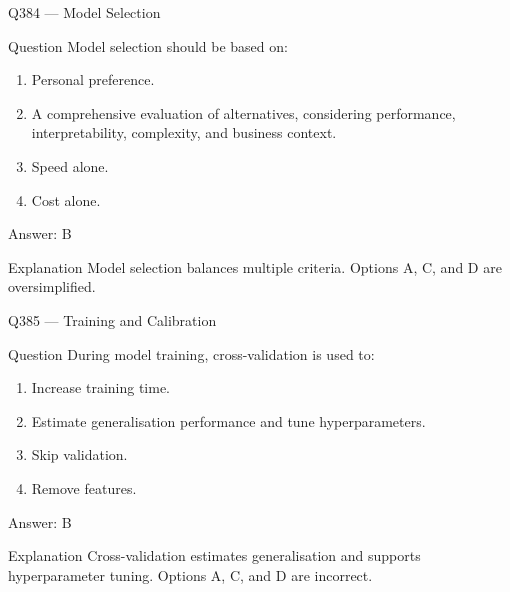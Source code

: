 \documentclass[aspectratio=169,8pt]{beamer}
\begin{document}
	\begin{frame}{Q384 --- Model Selection}
		\begin{block}{Question}
			Model selection should be based on:
			\begin{enumerate}
				\item Personal preference.
				\item A comprehensive evaluation of alternatives, considering performance, interpretability, complexity, and business context.
				\item Speed alone.
				\item Cost alone.
			\end{enumerate}
		\end{block}
		\begin{exampleblock}{Answer: B}\end{exampleblock}
		\begin{block}{Explanation}
			Model selection balances multiple criteria. Options A, C, and D are oversimplified.
		\end{block}
	\end{frame}
	
	\begin{frame}{Q385 --- Training and Calibration}
		\begin{block}{Question}
			During model training, cross-validation is used to:
			\begin{enumerate}
				\item Increase training time.
				\item Estimate generalisation performance and tune hyperparameters.
				\item Skip validation.
				\item Remove features.
			\end{enumerate}
		\end{block}
		\begin{exampleblock}{Answer: B}\end{exampleblock}
		\begin{block}{Explanation}
			Cross-validation estimates generalisation and supports hyperparameter tuning. Options A, C, and D are incorrect.
		\end{block}
	\end{frame}
	
\end{document}
